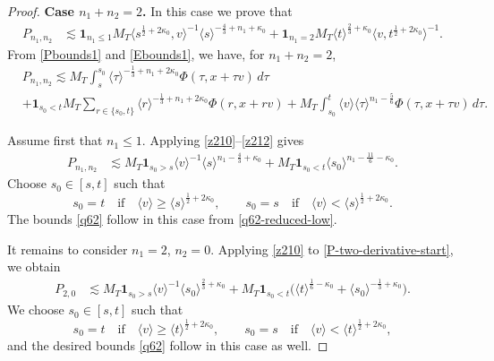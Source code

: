 \documentclass[reqno,11pt]{amsart}
\numberwithin{equation}{section}
\begin{document}
\begin{proof}
	{\bf{Case $n_1+n_2=2$.}} In this case we prove that
	\begin{align}
		P_{n_1,n_2}&\lesssim\mathbf{1}_{n_1\leq 1}M_T
		\langle s^{\frac12+2\kappa_0},v\rangle^{-1}
		\langle s\rangle^{-\frac43+n_1+\kappa_0}+\mathbf{1}_{n_1=2}M_T
		\langle t\rangle^{\frac23+\kappa_0}
		\langle v,t^{\frac12+2\kappa_0}\rangle^{-1}
		\label{q62}.
	\end{align}
	From \eqref{Pbounds1} and \eqref{Ebounds1}, we have, for $n_1+n_2=2$,
	\begin{equation}\label{P-two-derivative-start}
		\begin{split}
			&P_{n_1,n_2}\lesssim
			M_T\int_s^{s_0}
			\langle \tau\rangle^{-\frac13+n_1+2\kappa_0}\Phi(\tau,x+\tau v)\,d\tau\\
			&+\mathbf{1}_{s_0<t}M_T\sum_{r\in\{s_0,t\}}
			\langle r\rangle^{-\frac13+n_1+2\kappa_0}\Phi(r,x+rv)+M_T\int_{s_0}^{t}
			\langle v\rangle
			\langle \tau\rangle^{n_1-\frac56}
			\Phi(\tau,x+\tau v)\,d\tau.
		\end{split}	
	\end{equation}
	
	Assume first that $n_1\le1$. Applying \eqref{z210}--\eqref{z212} gives
	\begin{align}
		P_{n_1,n_2}
		&\lesssim
		M_T\mathbf 1_{s_0>s}
		\langle v\rangle^{-1}
		\langle s\rangle^{n_1-\frac43+\kappa_0}+
		M_T\mathbf 1_{s_0<t}
		\langle s_0\rangle^{n_1-\frac{11}{6}-\kappa_0}.
		\label{q62-reduced-low}
	\end{align}
	Choose $s_0\in[s,t]$ such that
	\begin{equation*}
		s_0=t
		\quad\text{if}\quad
		\langle v\rangle\ge \langle s\rangle^{\frac12+2\kappa_0},
		\qquad
		s_0=s
		\quad\text{if}\quad
		\langle v\rangle< \langle s\rangle^{\frac12+2\kappa_0}.
	\end{equation*}
	The bounds \eqref{q62} follow in this case from \eqref{q62-reduced-low}.
	
	
	It remains to consider $n_1=2$, $n_2=0$. Applying
	\eqref{z210} to \eqref{P-two-derivative-start}, we obtain
	\begin{align*}
		P_{2,0}&\lesssim M_T\mathbf 1_{s_0>s}\langle v\rangle^{-1}
		\langle s_0\rangle^{\frac23+\kappa_0}+M_T\mathbf 1_{s_0<t}
		\big(\langle t\rangle^{\frac16-\kappa_0}+\langle s_0\rangle^{-\frac13+\kappa_0}\big).
	\end{align*}
	We choose $s_0\in[s,t]$ such that
	\[
	s_0=t
	\quad\text{if}\quad
	\langle v\rangle\geq
	\langle t\rangle^{\frac12+2\kappa_0},
	\qquad
	s_0=s
	\quad\text{if}\quad
	\langle v\rangle<
	\langle t\rangle^{\frac12+2\kappa_0},
	\]
	and the desired bounds \eqref{q62} follow in this case as well.
	

\end{proof}
\end{document}
